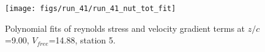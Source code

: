 \begin{figure}[H]
\centering
\texttt{[image: figs/run\_41/run\_41\_nut\_tot\_fit]}
\caption{Polynomial fits of reynolds stress and velocity gradient terms at $z/c$=9.00, $V_{free}$=14.88, station 5.}
\label{fig:run_41_nut_tot_fit}
\end{figure}


